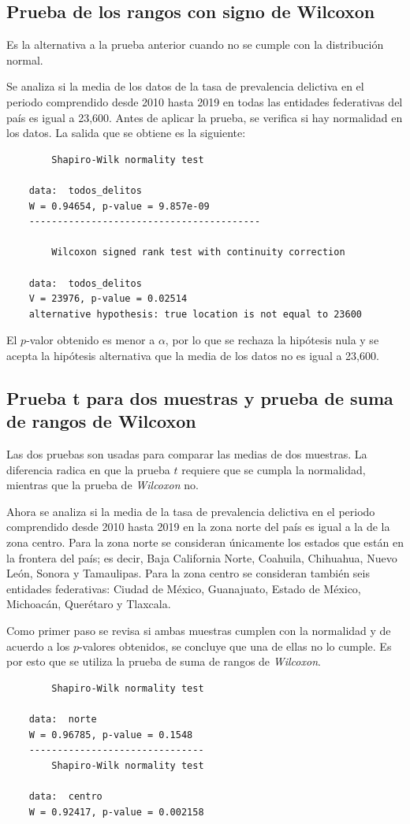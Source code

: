 \documentclass[12pt]{article}
\begin{document}
	\subsection{Prueba de los rangos con signo de Wilcoxon}
	
	Es la alternativa a la prueba anterior cuando no se cumple con la distribución normal.
	
	Se analiza si la media de los datos de la tasa de prevalencia delictiva en el periodo comprendido desde 2010 hasta 2019 en todas las entidades federativas del país es igual a 23,600. Antes de aplicar la prueba, se verifica si hay normalidad en los datos. La salida que se obtiene es la siguiente:
	\begin{verbatim}
		Shapiro-Wilk normality test
	
	data:  todos_delitos
	W = 0.94654, p-value = 9.857e-09
	-----------------------------------------
		
		Wilcoxon signed rank test with continuity correction
	
	data:  todos_delitos
	V = 23976, p-value = 0.02514
	alternative hypothesis: true location is not equal to 23600
	\end{verbatim}

	El $p$-valor obtenido es menor a $\alpha$, por lo que se rechaza la hipótesis nula y se acepta la hipótesis alternativa que la media de los datos no es igual a 23,600.
	
	\subsection{Prueba t para dos muestras y prueba de suma de rangos de Wilcoxon} \label{wilcox-2}
	
	Las dos pruebas son usadas para comparar las medias de dos muestras. La diferencia radica en que la prueba $t$ requiere que se cumpla la normalidad, mientras que la prueba de {\em Wilcoxon} no.
	
	Ahora se analiza si la media de la tasa de prevalencia delictiva en el periodo comprendido desde 2010 hasta 2019 en la zona norte del país es igual a la de la zona centro. Para la zona norte se consideran únicamente los estados que están en la frontera del país; es decir, Baja California Norte, Coahuila, Chihuahua, Nuevo León, Sonora y Tamaulipas. Para la zona centro se consideran también seis entidades federativas: Ciudad de México, Guanajuato, Estado de México, Michoacán, Querétaro y Tlaxcala.
	
	Como primer paso se revisa si ambas muestras cumplen con la normalidad y de acuerdo a los $p$-valores obtenidos, se concluye que una de ellas no lo cumple. Es por esto que se utiliza la prueba de suma de rangos de {\em Wilcoxon}. 
	\begin{verbatim}
		Shapiro-Wilk normality test
	
	data:  norte
	W = 0.96785, p-value = 0.1548
	-------------------------------
		Shapiro-Wilk normality test
	
	data:  centro
	W = 0.92417, p-value = 0.002158
	\end{verbatim}
	
\end{document}
